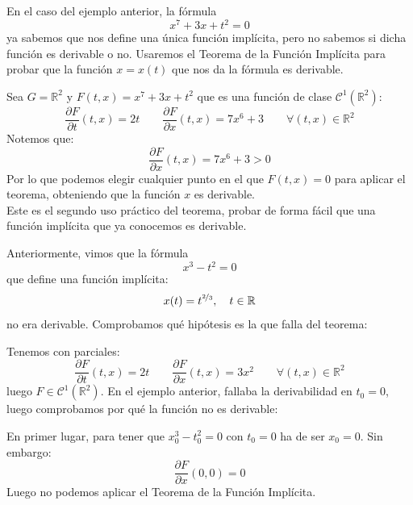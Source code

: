 \begin{ejemplo}
    En el caso del ejemplo anterior, la fórmula
    \begin{equation*}
        x^7+3x+t^2 = 0
    \end{equation*}
    ya sabemos que nos define una única función implícita, pero no sabemos si dicha función es derivable o no. Usaremos el Teorema de la Función Implícita para probar que la función $x=x(t)$ que nos da la fórmula es derivable.

    \noindent
    Sea $G = \mathbb{R}^2$ y $F(t,x) = x^7+3x+t^2$ que es una función de clase $\mathcal{C}^1(\mathbb{R}^2)$:
    \begin{equation*}
        \dfrac{\partial F}{\partial t}(t,x) = 2t \qquad \dfrac{\partial F}{\partial x}(t,x) = 7x^6 + 3 \qquad \forall (t,x)\in \mathbb{R}^2
    \end{equation*}
    Notemos que:
    \begin{equation*}
        \dfrac{\partial F}{\partial x}(t,x) = 7x^6 + 3 > 0
    \end{equation*}
    Por lo que podemos elegir cualquier punto en el que $F(t,x) = 0$ para aplicar el teorema, obteniendo que la función $x$ es derivable.\\

    Este es el segundo uso práctico del teorema, probar de forma fácil que una función implícita que ya conocemos es derivable.
\end{ejemplo}

\begin{ejemplo}
    Anteriormente, vimos que la fórmula
    \begin{equation*}
        x^3-t^2 = 0
    \end{equation*}
    que define una función implícita:
    \begin{equation*}
        x(t) = t^{\nicefrac{2}{3}}, \quad t\in \mathbb{R}
    \end{equation*}
    no era derivable. Comprobamos qué hipótesis es la que falla del teorema:

    \noindent
    Tenemos
    con parciales:
    \begin{equation*}
        \dfrac{\partial F}{\partial t}(t,x) = 2t \qquad \dfrac{\partial F}{\partial x}(t,x) = 3x^2 \qquad \forall (t,x)\in \mathbb{R}^2
    \end{equation*}
    luego $F\in \mathcal{C}^1(\mathbb{R}^2)$. En el ejemplo anterior, fallaba la derivabilidad en $t_0 = 0$, luego comprobamos por qué la función no es derivable:

    \noindent
    En primer lugar, para tener que $x_0^3 - t_0^2 = 0$ con $t_0 = 0$ ha de ser $x_0 = 0$. Sin embargo:
    \begin{equation*}
        \dfrac{\partial F}{\partial x}(0,0) = 0
    \end{equation*}
    Luego no podemos aplicar el Teorema de la Función Implícita.
\end{ejemplo}

